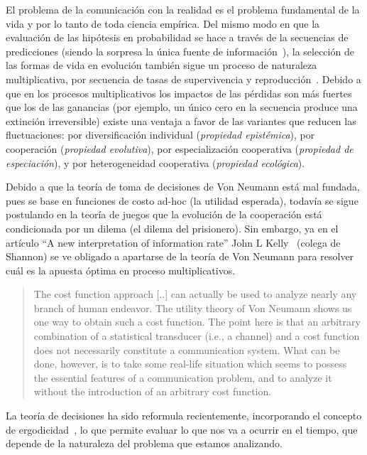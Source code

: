 \documentclass[10pt]{article}
\begin{document}
El problema de la comunicación con la realidad es el problema fundamental de la vida y por lo tanto de toda ciencia empírica.
Del mismo modo en que la evaluación de las hipótesis en probabilidad se hace a través de la secuencias de predicciones (siendo la sorpresa la única fuente de información~\cite{shannon1948-theoryOfCommunication}), la selección de las formas de vida en evolución también sigue un proceso de naturaleza multiplicativa, por secuencia de tasas de supervivencia y reproducción~\cite{taylor1978-replicatorDynamic,harper2009-replicatorAsInference,shalizi2009-replicatorAsInference, czegel2019-bayesianEvolution, czegel2022-bayesDarwin}.
Debido a que en los procesos multiplicativos los impactos de las pérdidas son más fuertes que los de las ganancias (por ejemplo, un único cero en la secuencia produce una extinción irreversible) existe una ventaja a favor de las variantes que reducen las fluctuaciones: por diversificación individual (\emph{propiedad epistémica}), por cooperación (\emph{propiedad evolutiva}), por especialización cooperativa (\emph{propiedad de especiación}), y por heterogeneidad cooperativa (\emph{propiedad ecológica}).


Debido a que la teoría de toma de decisiones de Von Neumann está mal fundada, pues se base en funciones de costo ad-hoc (la utilidad esperada), todavía se sigue postulando en la teoría de juegos que la evolución de la cooperación está condicionada por un dilema (el dilema del prisionero).
%
Sin embargo, ya en el artículo ``A new interpretation of information rate'' John L Kelly~\cite{kelly1956} (colega de Shannon) se ve obligado a apartarse de la teoría de Von Neumann para resolver cuál es la apuesta óptima en proceso multiplicativos.
%
\begin{quotation}
The cost function approach [..] can actually be used to analyze nearly any branch of human endeavor.
The utility theory of Von Neumann shows us one way to obtain such a cost function.
The point here is that an arbitrary combination of a statistical transducer (i.e., a channel) and a cost function does not necessarily constitute a communication system.
What can be done, however, is to take some real-life situation which seems to possess the essential features of a communication problem, and to analyze it without the introduction of an arbitrary cost function.
\end{quotation}
%
La teoría de decisiones ha sido reformula recientemente, incorporando el concepto de ergodicidad~\cite{peters2019-ergodicityEconomics, peters2021-interpretation}, lo que permite evaluar lo que nos va a ocurrir en el tiempo, que depende de la naturaleza del problema que estamos analizando.
\end{document}
